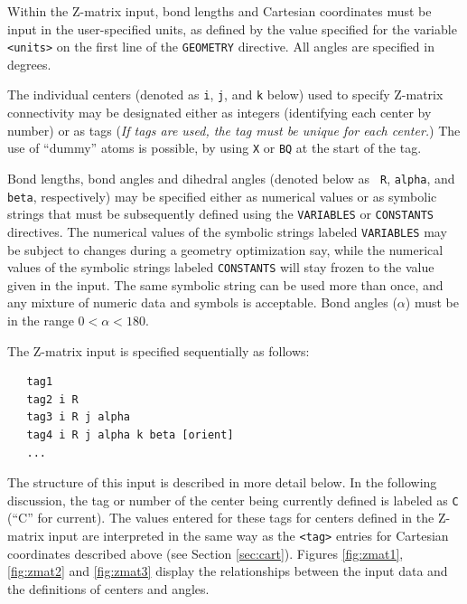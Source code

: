 Within the Z-matrix input, bond lengths and Cartesian coordinates must
be input in the user-specified units, as defined by the value specified
for the variable \verb+<units>+ on the first line of the \verb+GEOMETRY+
directive.  All angles are specified in
degrees.

The individual centers (denoted as \verb+i+, \verb+j+, and \verb+k+
below) used to specify Z-matrix connectivity may be designated either
as integers (identifying each center by number) or as tags ({\em If
  tags are used, the tag must be unique for each center.}) The use of
``dummy'' atoms is possible, by using \verb+X+ or \verb+BQ+ at the
start of the tag.

Bond lengths, bond angles and dihedral angles (denoted below as {\tt
  R}, {\tt alpha}, and {\tt beta}, respectively) may be specified
either as numerical values or as symbolic strings that must be
subsequently defined using the \verb+VARIABLES+ or \verb+CONSTANTS+
directives. The numerical values of the symbolic strings labeled
\verb+VARIABLES+ may be subject to changes during a geometry
optimization say, while the numerical values of the symbolic strings
labeled \verb+CONSTANTS+ will stay frozen to the value given in the
input.  The same symbolic string can be used more than once, and
any mixture of numeric data and symbols is acceptable. Bond angles
($\alpha$) must be in the range $0 < \alpha < 180$.

The Z-matrix input is specified sequentially as follows:
\begin{verbatim}
   tag1
   tag2 i R
   tag3 i R j alpha
   tag4 i R j alpha k beta [orient]
   ...
\end{verbatim}

The structure of this input is described in more detail below.  In the
following discussion, the tag or number of the center being currently
defined is labeled as \verb+C+ (``C'' for current).  The values
entered for these tags for centers defined in the Z-matrix input are
interpreted in the same way as the \verb+<tag>+ entries for Cartesian
coordinates described above (see Section \ref{sec:cart}).  Figures
\ref{fig:zmat1}, \ref{fig:zmat2} and \ref{fig:zmat3} display the
relationships between the input data and the definitions of centers
and angles.

